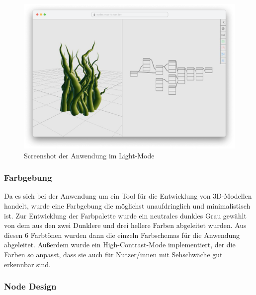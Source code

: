 \documentclass[ngerman]{article}
\begin{document}
\begin{figure}[hbtp]
  \centering
  \includegraphics[width=1\textwidth]{graphics/layout_light.pdf}
  \caption{Screenshot der Anwendung im Light-Mode}
  \label{fig:screenshot_nodarium}
\end{figure}

\subsubsection{Farbgebung}

Da es sich bei der Anwendung um ein Tool für die Entwicklung von 3D-Modellen handelt, wurde eine Farbgebung die möglichst unaufdringlich und minimalistisch ist.
Zur Entwicklung der Farbpalette wurde ein neutrales dunkles Grau gewählt von dem aus den zwei Dunklere und drei hellere Farben abgeleitet wurden. Aus diesen 6 Farbtönen wurden dann die einzeln Farbschemas für die Anwendung abgeleitet. Außerdem wurde ein High-Contrast-Mode implementiert, der die Farben so anpasst, dass sie auch für Nutzer/innen mit Sehschwäche gut erkennbar sind.

\subsubsection{Node Design}
\end{document}
